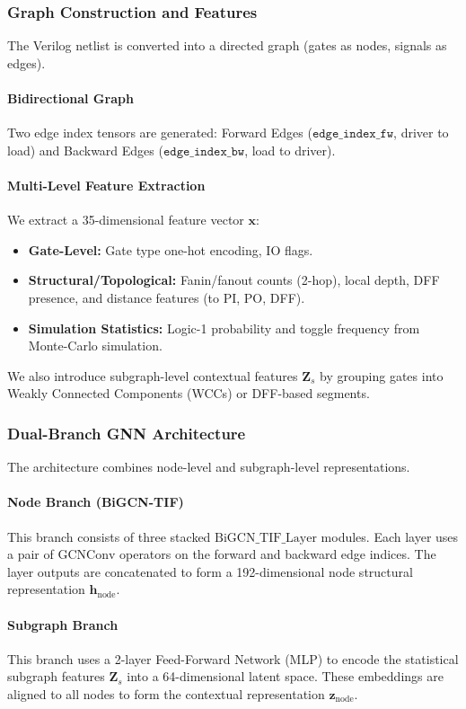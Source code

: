 \documentclass[conference]{IEEEtran}
\begin{document}
\subsubsection{Graph Construction and Features}
\label{sub:features_B}
The Verilog netlist is converted into a directed graph (gates as nodes, signals as edges).
\paragraph{Bidirectional Graph}
Two edge index tensors are generated: Forward Edges ($\texttt{edge\_index\_fw}$, driver to load) and Backward Edges ($\texttt{edge\_index\_bw}$, load to driver).
\paragraph{Multi-Level Feature Extraction}
We extract a 35-dimensional feature vector $\mathbf{x}$:
\begin{itemize}
    \item \textbf{Gate-Level:} Gate type one-hot encoding, IO flags.
    \item \textbf{Structural/Topological:} Fanin/fanout counts (2-hop), local depth, DFF presence, and distance features (to PI, PO, DFF).
    \item \textbf{Simulation Statistics:} Logic-1 probability and toggle frequency from Monte-Carlo simulation.
\end{itemize}
We also introduce subgraph-level contextual features $\mathbf{Z}_s$ by grouping gates into Weakly Connected Components (WCCs) or DFF-based segments.

\subsubsection{Dual-Branch GNN Architecture}
The architecture combines node-level and subgraph-level representations.

\paragraph{Node Branch (BiGCN-TIF)}
This branch consists of three stacked $\text{BiGCN\_TIF\_Layer}$ modules. Each layer uses a pair of $\text{GCNConv}$ operators on the forward and backward edge indices. The layer outputs are concatenated to form a 192-dimensional node structural representation $\mathbf{h}_{\text{node}}$.

\paragraph{Subgraph Branch}
This branch uses a 2-layer Feed-Forward Network (MLP) to encode the statistical subgraph features $\mathbf{Z}_s$ into a 64-dimensional latent space. These embeddings are aligned to all nodes to form the contextual representation $\mathbf{z}_{\text{node}}$.
\end{document}

